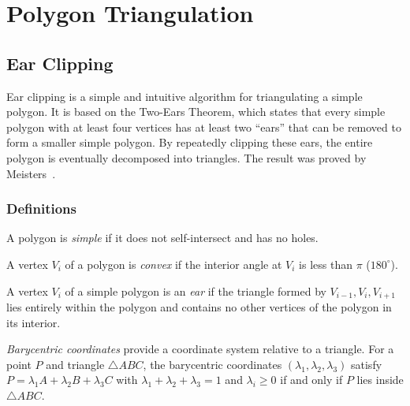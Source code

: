 \chapter{Polygon Triangulation}
\label{ch:triangulations}

\section{Ear Clipping}
\label{sec:ear_clipping}

Ear clipping is a simple and intuitive algorithm for triangulating a simple polygon. It is based on the Two-Ears Theorem, which states that every simple polygon with at least four vertices has at least two ``ears'' that can be removed to form a smaller simple polygon. By repeatedly clipping these ears, the entire polygon is eventually decomposed into triangles. The result was proved by Meisters~\cite{meisters1975}.

\subsection{Definitions}

\begin{definition}\label{def:simple_polygon_tc}
A polygon is \emph{simple} if it does not self-intersect and has no holes.
\end{definition}

\begin{definition}\label{def:convex_vertex}
A vertex $V_i$ of a polygon is \emph{convex} if the interior angle at $V_i$ is less than $\pi$ ($180^\circ$).
\end{definition}

\begin{definition}[Ear]\label{def:ear}
A vertex $V_i$ of a simple polygon is an \emph{ear} if the triangle formed by $V_{i-1}, V_i, V_{i+1}$ lies entirely within the polygon and contains no other vertices of the polygon in its interior.
\end{definition}

\begin{definition}\label{def:barycentric}
\emph{Barycentric coordinates} provide a coordinate system relative to a triangle. For a point $P$ and triangle $\triangle ABC$, the barycentric coordinates $(\lambda_1, \lambda_2, \lambda_3)$ satisfy $P = \lambda_1 A + \lambda_2 B + \lambda_3 C$ with $\lambda_1 + \lambda_2 + \lambda_3 = 1$ and $\lambda_i \ge 0$ if and only if $P$ lies inside $\triangle ABC$.
\end{definition}

